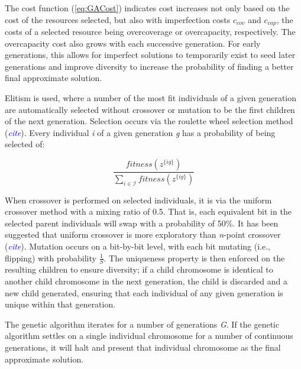 \documentclass[onecolumn,draftcls]{IEEEtran}
\begin{document}

The cost function (\ref{eq:GACost}) indicates cost increases not only based on the cost of the resources selected, but also with imperfection costs $c_{cov}$ and $c_{cap}$, the costs of a selected resource being overcoverage or overcapacity, respectively.  The overcapacity cost also grows with each successive generation.  For early generations, this allows for imperfect solutions to temporarily exist to seed later generations and improve diversity to increase the probability of finding a better final approximate solution.  %

Elitism is used, where a number of the most fit individuals of a given generation are automatically selected without crossover or mutation to be the first children of the next generation.  Selection occurs via the roulette wheel selection method (\textcolor{blue}{\textit{cite}}).  Every individual \textit{i} of a given generation \textit{g} has a probability of being selected of:

\[
\frac{fitness\left( z^{\{ig\}} \right)}{\sum_{i \in \mathcal{I}} fitness\left( z^{\{ig\}} \right)}
\]

When crossover is performed on selected individuals, it is via the uniform crossover method with a mixing ratio of 0.5.  That is, each equivalent bit in the selected parent individuals will swap with a probability of 50\%.  It has been suggested that uniform crossover is more exploratory than \textit{n}-point crossover (\textcolor{blue}{\textit{cite}}).  Mutation occurs on a bit-by-bit level, with each bit mutating (i.e., flipping) with probability $\frac{1}{S}$.  The uniqueness property is then enforced on the resulting children to ensure diversity; if a child chromosome is identical to another child chromosome in the next generation, the child is discarded and a new child generated, ensuring that each individual of any given generation is unique within that generation.

The genetic algorithm iterates for a number of generations \textit{G}.  If the genetic algorithm settles on a single individual chromosome for a number of continuous generations, it will halt and present that individual chromosome as the final approximate solution.
\end{document}
